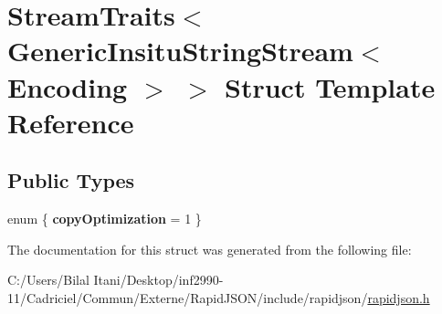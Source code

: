 \hypertarget{struct_stream_traits_3_01_generic_insitu_string_stream_3_01_encoding_01_4_01_4}{}\section{Stream\+Traits$<$ Generic\+Insitu\+String\+Stream$<$ Encoding $>$ $>$ Struct Template Reference}
\label{struct_stream_traits_3_01_generic_insitu_string_stream_3_01_encoding_01_4_01_4}
\subsection*{Public Types}
\begin{DoxyCompactItemize}
\item 
enum \{ {\bfseries copy\+Optimization} = 1
 \}\hypertarget{struct_stream_traits_3_01_generic_insitu_string_stream_3_01_encoding_01_4_01_4_ac1ef49a8b4d23348553d6aa93efb7746}{}\label{struct_stream_traits_3_01_generic_insitu_string_stream_3_01_encoding_01_4_01_4_ac1ef49a8b4d23348553d6aa93efb7746}

\end{DoxyCompactItemize}


The documentation for this struct was generated from the following file\+:\begin{DoxyCompactItemize}
\item 
C\+:/\+Users/\+Bilal Itani/\+Desktop/inf2990-\/11/\+Cadriciel/\+Commun/\+Externe/\+Rapid\+J\+S\+O\+N/include/rapidjson/\hyperlink{rapidjson_8h}{rapidjson.\+h}\end{DoxyCompactItemize}
